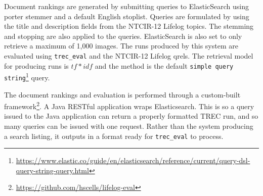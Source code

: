 Document rankings are generated by submitting queries to ElasticSearch using porter stemmer and a default English stoplist. Queries are formulated by using the title and description fields from the NTCIR-12 Lifelog topics. The stemming and stopping are also applied to the queries. ElasticSearch is also set to only retrieve a maximum of 1,000 images. The runs produced by this system are evaluated using \verb|trec_eval| and the NTCIR-12 Lifelog qrels. The retrieval model for producing runs is $tf*idf$ and the method is the default \verb|simple query string|\footnote{\url{https://www.elastic.co/guide/en/elasticsearch/reference/current/query-dsl-query-string-query.html}} query.

The document rankings and evaluation is performed through a custom-built framework\footnote{\url{https://github.com/hscells/lifelog-eval}}. A Java RESTful application wraps Elasticsearch. This is so a query issued to the Java application can return a properly formatted TREC run, and so many queries can be issued with one request. Rather than the system producing a search listing, it outputs in a format ready for \verb|trec_eval| to process.

